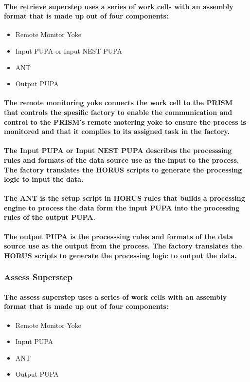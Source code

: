\documentclass{acm_proc_article-sp}
\begin{document}
\paragraph{The retrieve superstep uses a series of work cells with an assembly format that is made up out of four components:}
\begin{itemize}
\item{Remote Monitor Yoke}
\item{Input PUPA or Input NEST PUPA}
\item{ANT}
\item{Output PUPA}
\end{itemize}
\paragraph{The remote monitoring yoke connects the work cell to the PRISM that controls the spesific factory to enable the communication and control to the PRISM's remote motering yoke to ensure the process is monitored and that it complies to its assigned task in the factory.}
\paragraph{The Input PUPA or Input NEST PUPA describes the processsing rules and formats of the data source use as the input to the process. The factory translates the HORUS scripts to generate the processing logic to input the data.}
\paragraph{The ANT is the setup script in HORUS rules that builds a processing engine to process the data form the input PUPA into the processing rules of the output PUPA. }
\paragraph{The output PUPA is the processsing rules and formats of the data source use as the output from the process. The factory translates the HORUS scripts to generate the processing logic to output the data.}
\subsubsection{Assess Superstep}
\paragraph{The assess superstep uses a series of work cells with an assembly format that is made up out of four components:}
\begin{itemize}
\item{Remote Monitor Yoke}
\item{Input PUPA}
\item{ANT}
\item{Output PUPA}
\end{itemize}
\end{document}
